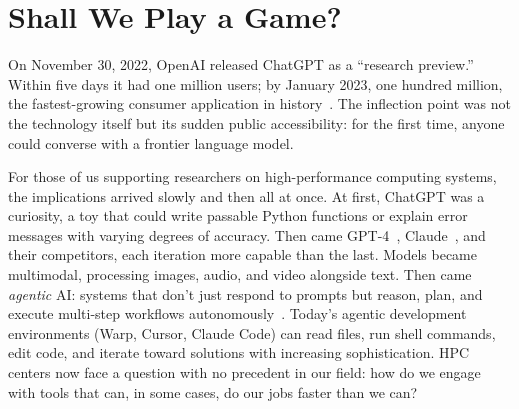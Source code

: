 \documentclass[sigconf]{acmart}
\begin{document}


\maketitle

\section{Shall We Play a Game?}

On November 30, 2022, OpenAI released ChatGPT as a ``research preview.''
Within five days it had one million users; by January 2023, one hundred
million, the fastest-growing consumer application in
history~\cite{openai2022chatgpt}. The inflection point was not the technology itself
but its sudden public accessibility: for the first time, anyone could converse with a
frontier language model.

For those of us supporting researchers on high-performance computing systems, the
implications arrived slowly and then all at once. At first, ChatGPT was a curiosity, a
toy that could write passable Python functions or explain error messages with
varying degrees of accuracy. Then came GPT-4~\cite{openai2023gpt4},
Claude~\cite{anthropic2024claude3}, and their competitors, each iteration more capable
than the last. Models became multimodal, processing images, audio, and video alongside
text. Then came \emph{agentic} AI: systems that don't just respond to prompts but
reason, plan, and execute multi-step workflows autonomously~\cite{yao2023react}.
Today's agentic development environments (Warp, Cursor, Claude Code) can read files,
run shell commands, edit code, and iterate toward solutions with increasing
sophistication. HPC centers now face a question with no precedent in our field: how do
we engage with tools that can, in some cases, do our jobs faster than we can?

\end{document}
